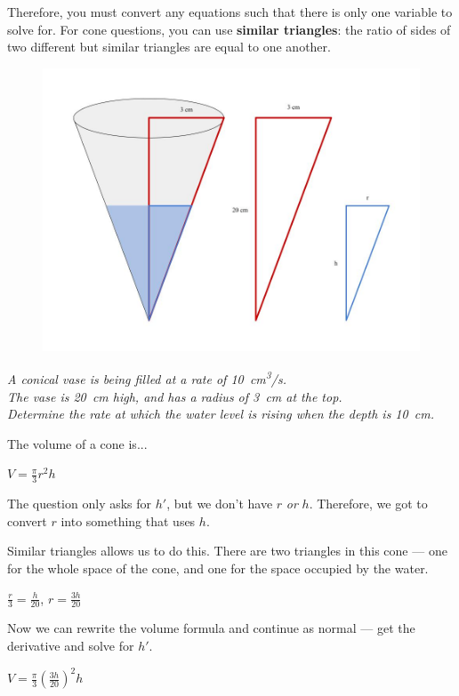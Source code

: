 \documentclass[a4paper,12pt]{article}
\begin{document}
Therefore, you must convert any equations such that there is only one variable to solve for. For cone questions, you can use \textbf{similar triangles}: the ratio of sides of two different but similar triangles are equal to one another.

\begin{figure}[H]
    \centering
    \includegraphics[width=\textwidth]{cone}
\end{figure}

\emph{A conical vase is being filled at a rate of \SI{10}{\cm\cubed/\s}.\\The vase is \SI{20}{\cm} high, and has a radius of \SI{3}{\cm} at the top.\\Determine the rate at which the water level is rising when the depth is \SI{10}{\cm}.}

The volume of a cone is...

$V = \frac{\pi}{3}r^2h$

The question only asks for $h'$, but we don't have $r$ \emph{or} $h$. Therefore, we got to convert $r$ into something that uses $h$.

Similar triangles allows us to do this. There are two triangles in this cone --- one for the whole space of the cone, and one for the space occupied by the water.

$\frac{r}{3} = \frac{h}{20}$, $r = \frac{3h}{20}$

Now we can rewrite the volume formula and continue as normal --- get the derivative and solve for $h'$.

$V = \frac{\pi}{3}(\frac{3h}{20})^2h$
\end{document}
